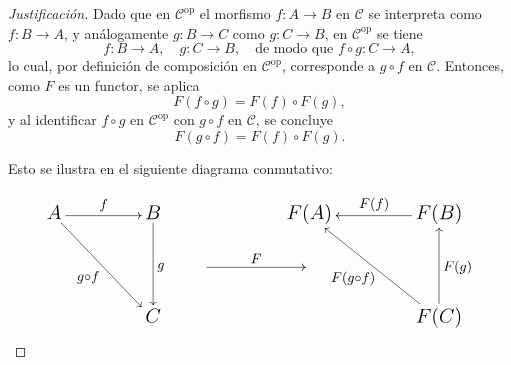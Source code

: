 \begin{proof}[Justificación]
	Dado que en $\mathcal{C}^{\mathrm{op}}$ el morfismo \( f: A \to B \) en $\mathcal{C}$ se interpreta como \( f: B \to A \), y análogamente \( g: B \to C \) como \( g: C \to B \), en $\mathcal{C}^{\mathrm{op}}$ se tiene
	$$
	f: B \to A, \quad g: C \to B, \quad \text{de modo que } f \circ g: C \to A,
	$$
	lo cual, por definición de composición en $\mathcal{C}^{\mathrm{op}}$, corresponde a \( g \circ f \) en $\mathcal{C}$. Entonces, como \(F\) es un functor, se aplica
	$$ F(f \circ g) = F(f) \circ F(g), $$
	y al identificar \( f \circ g \) en $\mathcal{C}^{\mathrm{op}}$ con \( g \circ f \) en $\mathcal{C}$, se concluye
	$$F(g \circ f) = F(f) \circ F(g). $$
	
	\noindent Esto se ilustra en el siguiente diagrama conmutativo:
	
	$$
	{\Large
		\xymatrix{
			A \ar[rr]^f \ar[ddrr]_{g\circ f}& & B \ar[dd]^g &          &  & F(A)  & & F(B) \ar[ll]_{F(f)}  \\
			& &             & \ar[rr]^F &  &                                            & &\\
			& & C           &          &  &                                            & &  F(C)  \ar[uull]^{F(g\circ f)} \ar[uu]_{F(g)}
		}
	} 
	$$
	
\end{proof}

\begin{definicion}
\end{definicion}





